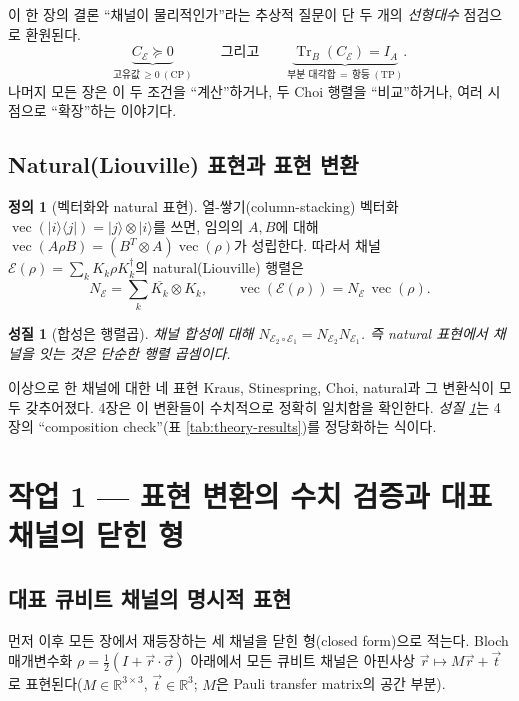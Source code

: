 \documentclass[11pt,a4paper]{article}
\newcommand{\E}{\mathcal{E}}
\newcommand{\Tr}{\operatorname{Tr}}
\newcommand{\vecop}{\operatorname{vec}}
\theoremstyle{definition}
\newtheorem{definition}{정의}[section]
\theoremstyle{plain}
\newtheorem{property}{성질}[section]
\theoremstyle{remark}
\begin{document}
\begin{mathbox}{이 한 장의 결론}
``채널이 물리적인가''라는 추상적 질문이 단 두 개의 \emph{선형대수} 점검으로 환원된다.
\[
\underbrace{C_\E\succeq0}_{\text{고유값}\,\ge0\ (\text{CP})}
\qquad\text{그리고}\qquad
\underbrace{\Tr_B(C_\E)=I_A}_{\text{부분 대각합}\,=\,\text{항등}\ (\text{TP})}.
\]
나머지 모든 장은 이 두 조건을 ``계산''하거나, 두 Choi 행렬을 ``비교''하거나, 여러 시점으로 ``확장''하는 이야기다.
\end{mathbox}

\subsection{Natural(Liouville) 표현과 표현 변환}

\begin{definition}[벡터화와 natural 표현]
열-쌓기(column-stacking) 벡터화 $\vecop(|i\rangle\langle j|)=|j\rangle\otimes|i\rangle$를 쓰면, 임의의 $A,B$에 대해 $\vecop(A\rho B)=(B^T\otimes A)\vecop(\rho)$가 성립한다. 따라서 채널 $\E(\rho)=\sum_k K_k\rho K_k^\dagger$의 natural(Liouville) 행렬은
\[
N_\E=\sum_k \overline{K_k}\otimes K_k,\qquad \vecop(\E(\rho))=N_\E\,\vecop(\rho).
\]
\end{definition}

\begin{property}[합성은 행렬곱]\label{prop:compose}
채널 합성에 대해 $N_{\E_2\circ\E_1}=N_{\E_2}N_{\E_1}$. 즉 natural 표현에서 채널을 잇는 것은 단순한 행렬 곱셈이다.
\end{property}

이상으로 한 채널에 대한 네 표현 Kraus, Stinespring, Choi, natural과 그 변환식이 모두 갖추어졌다. 4장은 이 변환들이 수치적으로 정확히 일치함을 확인한다. \emph{성질 \ref{prop:compose}}는 4장의 ``composition check''(표 \ref{tab:theory-results})를 정당화하는 식이다.

\section{작업 1 --- 표현 변환의 수치 검증과 대표 채널의 닫힌 형}

\subsection{대표 큐비트 채널의 명시적 표현}

먼저 이후 모든 장에서 재등장하는 세 채널을 닫힌 형(closed form)으로 적는다. Bloch 매개변수화 $\rho=\tfrac12(I+\vec r\cdot\vec\sigma)$ 아래에서 모든 큐비트 채널은 아핀사상 $\vec r\mapsto M\vec r+\vec t$로 표현된다($M\in\mathbb R^{3\times3}$, $\vec t\in\mathbb R^3$; $M$은 Pauli transfer matrix의 공간 부분).
\end{document}
